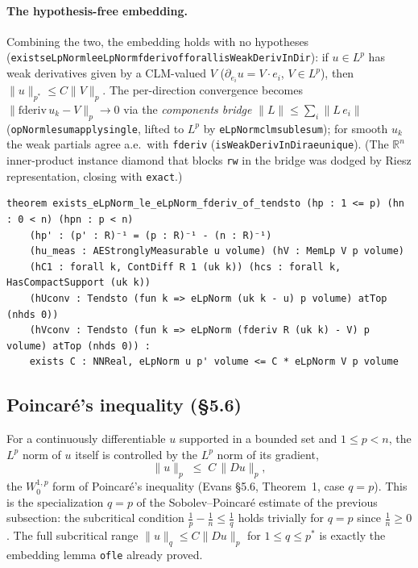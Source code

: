 ﻿\documentclass[12pt, a4paper]{article}
\renewcommand{\_}{\origunderscore\allowbreak}
\theoremstyle{definition}
\theoremstyle{plain}
\begin{document}
\paragraph{The hypothesis-free embedding.}  Combining the two, the embedding holds with no hypotheses
(\texttt{exists\_eLpNorm\_le\_eLpNorm\_fderiv\_of\_forall\_isWeakDerivInDir}): if $u\in L^p$ has weak
derivatives given by a CLM-valued $V$ ($\partial_{e_i}u=V\cdot e_i$, $V\in L^p$), then
$\|u\|_{p^*}\le C\|V\|_p$.  The per-direction convergence becomes $\|\mathrm{fderiv}\,u_k-V\|_p\to0$ via
the \emph{components bridge} $\|L\|\le\sum_i\|L\,e_i\|$ (\texttt{opNorm\_le\_sum\_apply\_single}, lifted
to $L^p$ by \texttt{eLpNorm\_clm\_sub\_le\_sum}); for smooth $u_k$ the weak partials agree a.e.\ with
\texttt{fderiv} (\texttt{isWeakDerivInDir\_ae\_unique}).  (The $\mathbb{R}^n$ inner-product instance
diamond that blocks \texttt{rw} in the bridge was dodged by Riesz representation, closing with
\texttt{exact}.)

\begin{lstlisting}[caption={Sobolev embedding for all of W^1p via limits (proved, zero sorry)}]
theorem exists_eLpNorm_le_eLpNorm_fderiv_of_tendsto (hp : 1 <= p) (hn : 0 < n) (hpn : p < n)
    (hp' : (p' : R)⁻¹ = (p : R)⁻¹ - (n : R)⁻¹)
    (hu_meas : AEStronglyMeasurable u volume) (hV : MemLp V p volume)
    (hC1 : forall k, ContDiff R 1 (uk k)) (hcs : forall k, HasCompactSupport (uk k))
    (hUconv : Tendsto (fun k => eLpNorm (uk k - u) p volume) atTop (nhds 0))
    (hVconv : Tendsto (fun k => eLpNorm (fderiv R (uk k) - V) p volume) atTop (nhds 0)) :
    exists C : NNReal, eLpNorm u p' volume <= C * eLpNorm V p volume
\end{lstlisting}

\subsection{Poincar\'e's inequality (§5.6)}

For a continuously differentiable $u$ supported in a bounded set and $1\le p<n$, the $L^p$ norm of
$u$ itself is controlled by the $L^p$ norm of its gradient,
\[
  \|u\|_p \;\le\; C\,\|Du\|_p ,
\]
the $W^{1,p}_0$ form of Poincar\'e's inequality (Evans §5.6, Theorem~1, case $q=p$).  This is the
specialization $q=p$ of the Sobolev--Poincar\'e estimate of the previous subsection: the subcritical
condition $\tfrac1p-\tfrac1n\le\tfrac1q$ holds trivially for $q=p$ since $\tfrac1n\ge0$.  The full
subcritical range $\|u\|_q\le C\|Du\|_p$ for $1\le q\le p^*$ is exactly the embedding lemma
\texttt{\_of\_le} already proved.
\end{document}
